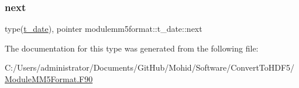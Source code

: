 \mbox{\label{structmodulemm5format_1_1t__date_a4b9ba6e912c01a4a38612cc74388bd3a}} 
\subsubsection{\texorpdfstring{next}{next}}
{\footnotesize\ttfamily type(\mbox{\hyperlink{structmodulemm5format_1_1t__date}{t\+\_\+date}}), pointer modulemm5format\+::t\+\_\+date\+::next\hspace{0.3cm}{\ttfamily [private]}}



The documentation for this type was generated from the following file\+:\begin{DoxyCompactItemize}
\item 
C\+:/\+Users/administrator/\+Documents/\+Git\+Hub/\+Mohid/\+Software/\+Convert\+To\+H\+D\+F5/\mbox{\hyperlink{_module_m_m5_format_8_f90}{Module\+M\+M5\+Format.\+F90}}\end{DoxyCompactItemize}
